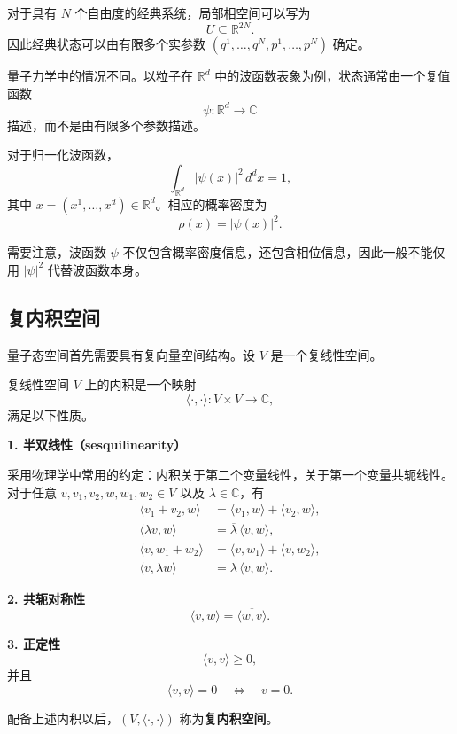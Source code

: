 \documentclass[UTF8,a4paper,11pt,openany]{ctexbook}
\begin{document}
对于具有 $N$ 个自由度的经典系统，局部相空间可以写为
\[
U\subseteq\mathbb R^{2N}.
\]
因此经典状态可以由有限多个实参数 $(q^1,\ldots,q^N,p^1,\ldots,p^N)$ 确定。

量子力学中的情况不同。以粒子在 $\mathbb R^d$ 中的波函数表象为例，状态通常由一个复值函数
\[
\psi:\mathbb R^d\longrightarrow\mathbb C
\]
描述，而不是由有限多个参数描述。

对于归一化波函数，
\begin{equation}
    \int_{\mathbb R^d}
    |\psi(x)|^2\,d^dx
    =1,
\end{equation}
其中 $x=(x^1,\ldots,x^d)\in\mathbb R^d$。相应的概率密度为
\begin{equation}
    \rho(x)=|\psi(x)|^2.
\end{equation}

需要注意，波函数 $\psi$ 不仅包含概率密度信息，还包含相位信息，因此一般不能仅用 $|\psi|^2$ 代替波函数本身。

\subsection{复内积空间}

量子态空间首先需要具有复向量空间结构。设 $V$ 是一个复线性空间。

\begin{definition}[复内积]
复线性空间 $V$ 上的内积是一个映射
\[
\langle\cdot,\cdot\rangle:
V\times V\longrightarrow\mathbb C,
\]
满足以下性质。

\textbf{1. 半双线性（sesquilinearity）}

采用物理学中常用的约定：内积关于第二个变量线性，关于第一个变量共轭线性。对于任意 $v,v_1,v_2,w,w_1,w_2\in V$ 以及 $\lambda\in\mathbb C$，有
\begin{align}
    \langle v_1+v_2,w\rangle
    &=
    \langle v_1,w\rangle
    +
    \langle v_2,w\rangle,
    \\
    \langle \lambda v,w\rangle
    &=
    \overline{\lambda}\,
    \langle v,w\rangle,
    \\
    \langle v,w_1+w_2\rangle
    &=
    \langle v,w_1\rangle
    +
    \langle v,w_2\rangle,
    \\
    \langle v,\lambda w\rangle
    &=
    \lambda\,
    \langle v,w\rangle.
\end{align}

\textbf{2. 共轭对称性}
\begin{equation}
    \langle v,w\rangle
    =
    \overline{\langle w,v\rangle}.
\end{equation}

\textbf{3. 正定性}
\begin{equation}
    \langle v,v\rangle\geq 0,
\end{equation}
并且
\begin{equation}
    \langle v,v\rangle=0
    \quad\Longleftrightarrow\quad
    v=0.
\end{equation}

配备上述内积以后，$(V,\langle\cdot,\cdot\rangle)$ 称为\textbf{复内积空间}。
\end{definition}
\end{document}
